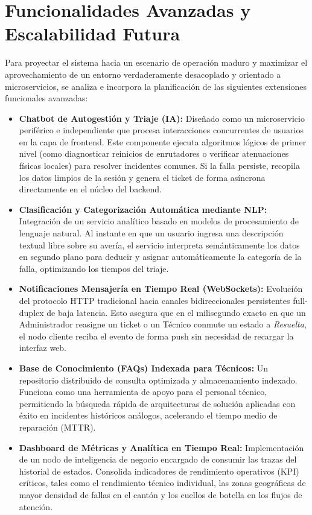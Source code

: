 \documentclass[12pt,letterpaper]{article}
\begin{document}
\newpage
\section{Funcionalidades Avanzadas y Escalabilidad Futura}
Para proyectar el sistema hacia un escenario de operación maduro y maximizar el aprovechamiento de un entorno verdaderamente desacoplado y orientado a microservicios, se analiza e incorpora la planificación de las siguientes extensiones funcionales avanzadas:

\begin{itemize}
    \item \textbf{Chatbot de Autogestión y Triaje (IA):} Diseñado como un microservicio periférico e independiente que procesa interacciones concurrentes de usuarios en la capa de frontend. Este componente ejecuta algoritmos lógicos de primer nivel (como diagnosticar reinicios de enrutadores o verificar atenuaciones físicas locales) para resolver incidentes comunes. Si la falla persiste, recopila los datos limpios de la sesión y genera el ticket de forma asíncrona directamente en el núcleo del backend.
    \item \textbf{Clasificación y Categorización Automática mediante NLP:} Integración de un servicio analítico basado en modelos de procesamiento de lenguaje natural. Al instante en que un usuario ingresa una descripción textual libre sobre su avería, el servicio interpreta semánticamente los datos en segundo plano para deducir y asignar automáticamente la categoría de la falla, optimizando los tiempos del triaje.
    \item \textbf{Notificaciones Mensajería en Tiempo Real (WebSockets):} Evolución del protocolo HTTP tradicional hacia canales bidireccionales persistentes full-duplex de baja latencia. Esto asegura que en el milisegundo exacto en que un Administrador reasigne un ticket o un Técnico conmute un estado a \textit{Resuelta}, el nodo cliente reciba el evento de forma push sin necesidad de recargar la interfaz web.
    \item \textbf{Base de Conocimiento (FAQs) Indexada para Técnicos:} Un repositorio distribuido de consulta optimizada y almacenamiento indexado. Funciona como una herramienta de apoyo para el personal técnico, permitiendo la búsqueda rápida de arquitecturas de solución aplicadas con éxito en incidentes históricos análogos, acelerando el tiempo medio de reparación (MTTR).
    \item \textbf{Dashboard de Métricas y Analítica en Tiempo Real:} Implementación de un nodo de inteligencia de negocio encargado de consumir las trazas del historial de estados. Consolida indicadores de rendimiento operativos (KPI) críticos, tales como el rendimiento técnico individual, las zonas geográficas de mayor densidad de fallas en el cantón y los cuellos de botella en los flujos de atención.
\end{itemize}
\end{document}
